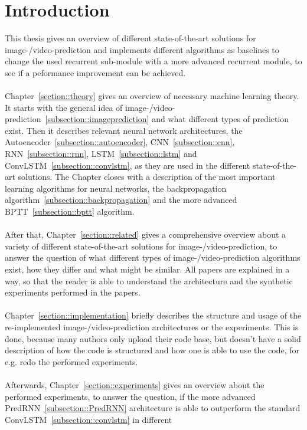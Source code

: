 \section{Introduction} \label{section::introduction}
 This thesis gives an overview of different state-of-the-art solutions for image-/video-prediction and implements different algorithms as baselines to change the 
 used recurrent sub-module with a more advanced recurrent module, to see if a peformance improvement can be achieved.
 \\\\
 Chapter~\ref{section::theory} gives an overview of necessary machine learning theory. It starts with the general idea of
 image-/video-prediction~\ref{subsection::imageprediction} and what different types of prediction exist. Then it describes relevant neural network architectures, the 
 Autoencoder~\ref{subsection::autoencoder}, CNN~\ref{subsection::cnn}, RNN~\ref{subsection::rnn}, LSTM~\ref{subsection::lstm} and
 ConvLSTM~\ref{subsection::convlstm}, as they are used in the different state-of-the-art solutions. The Chapter closes with
 a description of the most important learning algorithms for neural networks, the backpropagation algorithm~\ref{subsection::backpropagation} and the more advanced 
 BPTT~\ref{subsection::bptt} algorithm.
 \\\\
 After that, Chapter~\ref{section::related} gives a comprehensive overview about a variety of different state-of-the-art solutions for image-/video-prediction,
 to answer the question of what different types of image-/video-prediction algorithms exist, how they differ and what might be similar. All papers are explained
 in a way, so that the reader is able to understand the architecture and the synthetic experiments performed in the papers.
 \\\\
 Chapter~\ref{section::implementation} briefly describes the structure and usage of the re-implemented image-/video-prediction architectures or the experiments. 
 This is done, because many authors only upload
 their code base, but doesn't have a solid description of how the code is structured and how one is able to use the code, for e.g. redo the performed experiments.
 \\\\
 Afterwards, Chapter~\ref{section::experiments} gives an overview about the performed experiments, to answer the question, if
 the more advanced PredRNN~\ref{subsection::PredRNN} architecture is able to outperform the standard ConvLSTM~\ref{subsection::convlstm} in different

